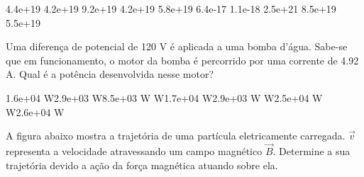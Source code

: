 \documentclass[12pt, addpoints]{exam}
\begin{document}
\begin{questions}
\begin{multicols*}{2}
\begin{oneparchoices}
\choice 4.4e+19 \choice 4.2e+19 \choice 9.2e+19 \choice 4.2e+19 \choice 5.8e+19 \choice 6.4e-17 \choice 1.1e-18 \choice 2.5e+21 \choice 8.5e+19 \choice 5.5e+19 
\end{oneparchoices}\question Uma diferença de potencial de 120 V é aplicada a uma bomba d’água. Sabe-se que em funcionamento, o motor da bomba é percorrido por uma corrente de    4.92 A. Qual é a potência desenvolvida nesse motor?

\begin{oneparchoices}
\choice 1.6e+04 W\choice 2.9e+03 W\choice 8.5e+03 W W\choice 1.7e+04 W\choice 2.9e+03 W W\choice 2.5e+04 W W\choice 2.6e+04 W
\end{oneparchoices}\question A ﬁgura abaixo mostra a trajetória de uma partícula eletricamente carregada. $\vec{{v}}$ representa a velocidade atravessando um campo magnético $\vec{{B}}$. Determine a sua trajetória devido a ação da força magnética atuando sobre ela.
        
        \begin{center}
            \begin{minipage}[c]{0.5\linewidth}
            \end{minipage}
        \end{center}

        


\end{multicols*}
\end{questions}
\end{document}
